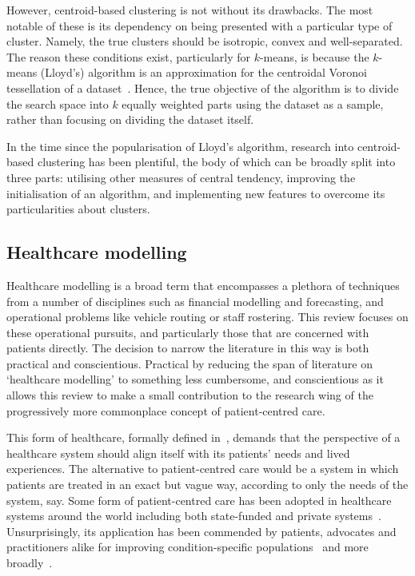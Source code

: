 However, centroid-based clustering is not without its drawbacks. The most
notable of these is its dependency on being presented with a particular type of
cluster. Namely, the true clusters should be isotropic, convex and
well-separated. The reason these conditions exist, particularly for \(k\)-means,
is because the \(k\)-means (Lloyd's) algorithm is an approximation for the
centroidal Voronoi tessellation of a dataset~\cite{Du2006}. Hence, the true
objective of the algorithm is to divide the search space into \(k\) equally
weighted parts using the dataset as a sample, rather than focusing on dividing
the dataset itself.

In the time since the popularisation of Lloyd's algorithm, research into
centroid-based clustering has been plentiful, the body of which can be broadly
split into three parts: utilising other measures of central tendency, improving
the initialisation of an algorithm, and implementing new features to overcome
its particularities about clusters.



\subsection{Healthcare modelling}

Healthcare modelling is a broad term that encompasses a plethora of techniques
from a number of disciplines such as financial modelling and forecasting, and
operational problems like vehicle routing or staff rostering. This review
focuses on these operational pursuits, and particularly those that are concerned
with patients directly. The decision to narrow the literature in this way is
both practical and conscientious. Practical by reducing the span of literature
on `healthcare modelling' to something less cumbersome, and conscientious as it
allows this review to make a small contribution to the research wing of the
progressively more commonplace concept of patient-centred care.

This form of healthcare, formally defined in~\cite{Robinson2008}, demands that
the perspective of a healthcare system should align itself with its patients'
needs and lived experiences. The alternative to patient-centred care would be a
system in which patients are treated in an exact but vague way, according to
only the needs of the system, say. Some form of patient-centred care has been
adopted in healthcare systems around the world including both state-funded and
private systems~\cite{DoH2010,Dewi2013,Luxford2011}. Unsurprisingly, its
application has been commended by patients, advocates and practitioners alike
for improving condition-specific
populations~\cite{Foster2019,Gambling2010,Gondek2016,Tsianakas2012} and more
broadly~\cite{IAPO2012,Richards2015,Santana2019}.

